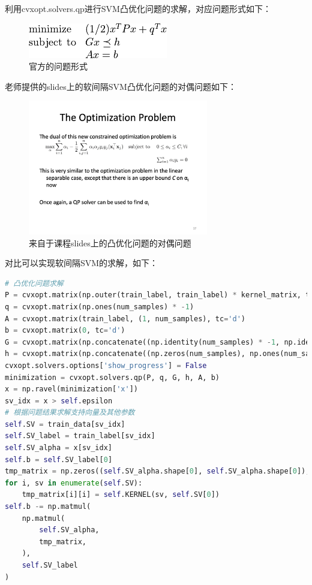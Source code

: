 \documentclass[UTF8]{article}
\begin{document}
    利用{\jetbrains cvxopt.solvers.qp}进行SVM凸优化问题的求解，对应问题形式如下：
    \begin{figure}[H]
        \centering
        \includegraphics[]{./figs/cvxopt_qp.png}
        \caption{官方的问题形式}
    \end{figure}
    老师提供的slides上的软间隔SVM凸优化问题的对偶问题如下：
    \begin{figure}[H]
        \centering
        \includegraphics[width=0.7\textwidth]{./figs/soft_svm_from_slides.jpg}
        \caption{来自于课程slides上的凸优化问题的对偶问题}
    \end{figure}
    对比可以实现软间隔SVM的求解，如下：
    \begin{lstlisting}[language=python]
# 凸优化问题求解
P = cvxopt.matrix(np.outer(train_label, train_label) * kernel_matrix, tc='d')
q = cvxopt.matrix(np.ones(num_samples) * -1)
A = cvxopt.matrix(train_label, (1, num_samples), tc='d')
b = cvxopt.matrix(0, tc='d')
G = cvxopt.matrix(np.concatenate((np.identity(num_samples) * -1, np.identity(num_samples)), axis=0))
h = cvxopt.matrix(np.concatenate((np.zeros(num_samples), np.ones(num_samples) * self.C), axis=0))
cvxopt.solvers.options['show_progress'] = False
minimization = cvxopt.solvers.qp(P, q, G, h, A, b)
x = np.ravel(minimization['x'])
sv_idx = x > self.epsilon
# 根据问题结果求解支持向量及其他参数
self.SV = train_data[sv_idx]
self.SV_label = train_label[sv_idx]
self.SV_alpha = x[sv_idx]
self.b = self.SV_label[0]
tmp_matrix = np.zeros((self.SV_alpha.shape[0], self.SV_alpha.shape[0]), dtype=np.float64)
for i, sv in enumerate(self.SV):
    tmp_matrix[i][i] = self.KERNEL(sv, self.SV[0])
self.b -= np.matmul(
    np.matmul(
        self.SV_alpha,
        tmp_matrix,
    ),
    self.SV_label
)
    \end{lstlisting}
\end{document}
